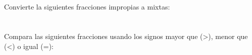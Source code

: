 \documentclass[12pt,addpoints]{evalua}
\begin{document}
\begin{questions}
    \subsection*{\else{}\fi}

    \question[4] Convierte la siguientes fracciones impropias a mixtas:
    \begin{multicols}{3}
    \end{multicols}

    \newpage
    \section*{\else{}\fi}

    \subsection*{\else{}\fi}

    \question[8] Compara las siguientes fracciones usando los signos mayor que (>), menor que (<) o igual (=):
    \begin{multicols}{3}
\end{multicols}
\end{questions}
\end{document}
